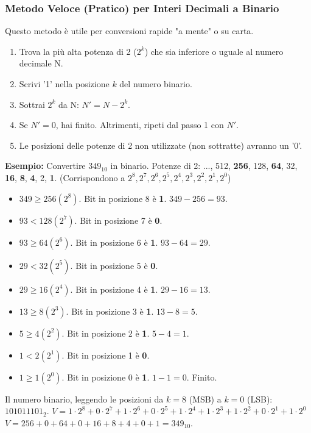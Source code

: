 \subsubsection{Metodo Veloce (Pratico) per Interi Decimali a Binario}
Questo metodo è utile per conversioni rapide "a mente" o su carta.
\begin{enumerate}
    \item Trova la più alta potenza di 2 ($2^k$) che sia inferiore o uguale al numero decimale N.
    \item Scrivi '1' nella posizione $k$ del numero binario.
    \item Sottrai $2^k$ da N: $N' = N - 2^k$.
    \item Se $N'=0$, hai finito. Altrimenti, ripeti dal passo 1 con $N'$.
    \item Le posizioni delle potenze di 2 non utilizzate (non sottratte) avranno un '0'.
\end{enumerate}
\textbf{Esempio:} Convertire $349_{10}$ in binario.
Potenze di 2: ..., 512, \textbf{256}, 128, \textbf{64}, 32, \textbf{16}, \textbf{8}, \textbf{4}, 2, \textbf{1}.
(Corrispondono a $2^8, 2^7, 2^6, 2^5, 2^4, 2^3, 2^2, 2^1, 2^0$)
\begin{itemize}
    \item $349 \ge 256 (2^8)$. Bit in posizione 8 è \textbf{1}.
    $349 - 256 = 93$.
    \item $93 < 128 (2^7)$. Bit in posizione 7 è \textbf{0}.
    \item $93 \ge 64 (2^6)$. Bit in posizione 6 è \textbf{1}.
    $93 - 64 = 29$.
    \item $29 < 32 (2^5)$. Bit in posizione 5 è \textbf{0}.
    \item $29 \ge 16 (2^4)$. Bit in posizione 4 è \textbf{1}.
    $29 - 16 = 13$.
    \item $13 \ge 8 (2^3)$. Bit in posizione 3 è \textbf{1}.
    $13 - 8 = 5$.
    \item $5 \ge 4 (2^2)$. Bit in posizione 2 è \textbf{1}.
    $5 - 4 = 1$.
    \item $1 < 2 (2^1)$. Bit in posizione 1 è \textbf{0}.
    \item $1 \ge 1 (2^0)$. Bit in posizione 0 è \textbf{1}.
    $1 - 1 = 0$. Finito.
\end{itemize}
Il numero binario, leggendo le posizioni da $k=8$ (MSB) a $k=0$ (LSB): $101011101_2$.
$V = 1 \cdot 2^8 + 0 \cdot 2^7 + 1 \cdot 2^6 + 0 \cdot 2^5 + 1 \cdot 2^4 + 1 \cdot 2^3 + 1 \cdot 2^2 + 0 \cdot 2^1 + 1 \cdot 2^0$
$V = 256 + 0 + 64 + 0 + 16 + 8 + 4 + 0 + 1 = 349_{10}$.

